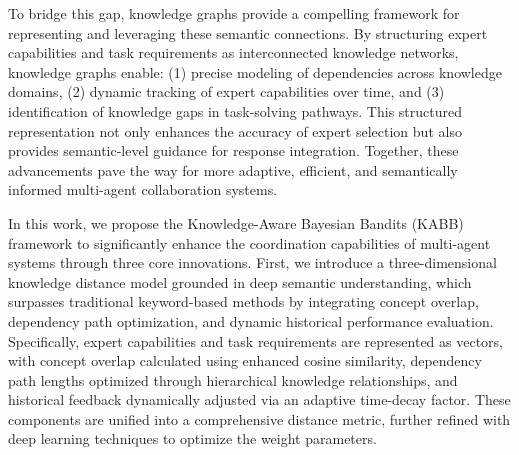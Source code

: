 To bridge this gap, knowledge graphs \cite{ge2024knowledge} provide a compelling framework for representing and leveraging these semantic connections. By structuring expert capabilities and task requirements as interconnected knowledge networks, knowledge graphs enable: (1) precise modeling of dependencies across knowledge domains, (2) dynamic tracking of expert capabilities over time, and (3) identification of knowledge gaps in task-solving pathways. This structured representation not only enhances the accuracy of expert selection but also provides semantic-level guidance for response integration. Together, these advancements pave the way for more adaptive, efficient, and semantically informed multi-agent collaboration systems.


In this work, we propose the Knowledge-Aware Bayesian Bandits (KABB) framework to significantly enhance the coordination capabilities of multi-agent systems through three core innovations.
First, we introduce a three-dimensional knowledge distance model grounded in deep semantic understanding, which surpasses traditional keyword-based methods by integrating concept overlap, dependency path optimization, and dynamic historical performance evaluation. Specifically, expert capabilities and task requirements are represented as vectors, with concept overlap calculated using enhanced cosine similarity, dependency path lengths optimized through hierarchical knowledge relationships, and historical feedback dynamically adjusted via an adaptive time-decay factor. These components are unified into a comprehensive distance metric, further refined with deep learning techniques to optimize the weight parameters.

